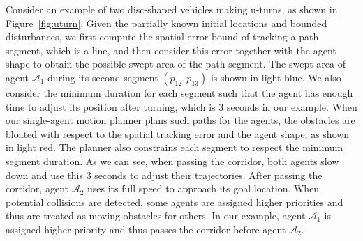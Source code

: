 \documentclass[letterpaper]{article} %
\theoremstyle{definition}
\begin{document}


Consider an example of two disc-shaped vehicles making u-turns, as shown in Figure~\ref{fig:uturn}. Given the partially known initial locations and bounded disturbances, we first compute the spatial error bound of tracking a path segment, which is a line, and then consider this error together with the agent shape to obtain the possible swept area of the path segment. The swept area of agent $\mathcal{A}_1$ during its second segment $(p_{12}, p_{13})$ is shown in light blue. We also consider the minimum duration for each segment such that the agent has enough time to adjust its position after turning, which is $3$ seconds in our example. When our single-agent motion planner plans such paths for the agents, the obstacles are bloated with respect to the spatial tracking error and the agent shape, as shown in light red. 
The planner also constrains each segment to respect the minimum segment duration. As we can see, when passing the corridor, both agents slow down and use this $3$ seconds to adjust their trajectories. After passing the corridor, agent $\mathcal{A}_2$ uses its full speed to approach its goal location. When potential collisions are detected, some agents are assigned higher priorities and thus are treated as moving obstacles for others. In our example, agent $\mathcal{A}_1$ is assigned higher priority and thus passes the corridor before agent $\mathcal{A}_2$.
\end{document}
